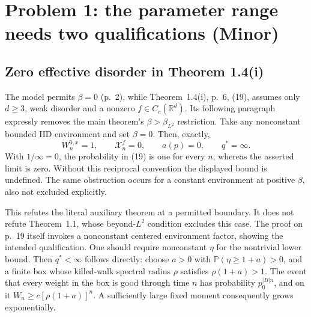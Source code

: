 \documentclass[10pt]{article}
\begin{document}
\section*{Problem 1: the parameter range needs two qualifications (Minor)}
\subsection*{Zero effective disorder in Theorem 1.4(i)}
The model permits \(\beta=0\) (p. 2), while Theorem 1.4(i), p. 6, (19), assumes only \(d\geq3\), weak disorder and a nonzero \(f\in C_c(\mathbb R^d)\). Its following paragraph expressly removes the main theorem’s \(\beta>\beta_{L^2}\) restriction. Take any nonconstant bounded IID environment and set \(\beta=0\). Then, exactly, \[W_n^{0,x}=1,\qquad \mathcal X_n^f=0,\qquad a(p)=0,\qquad q^*=\infty .\] With \(1/\infty=0\), the probability in (19) is one for every \(n\), whereas the asserted limit is zero. Without this reciprocal convention the displayed bound is undefined. The same obstruction occurs for a constant environment at positive \(\beta\), also not excluded explicitly.\par
This refutes the literal auxiliary theorem at a permitted boundary. It does not refute Theorem 1.1, whose beyond-\(L^2\) condition excludes this case. The proof on p. 19 itself invokes a nonconstant centered environment factor, showing the intended qualification. One should require nonconstant \(\eta\) for the nontrivial lower bound. Then \(q^*<\infty\) follows directly: choose \(a>0\) with \(\mathbb P(\eta\geq1+a)>0\), and a finite box whose killed-walk spectral radius \(\rho\) satisfies \(\rho(1+a)>1\). The event that every weight in the box is good through time \(n\) has probability \(p_0^{|B|n}\), and on it \(W_n\geq c[\rho(1+a)]^n\). A sufficiently large fixed moment consequently grows exponentially.\par
\end{document}
